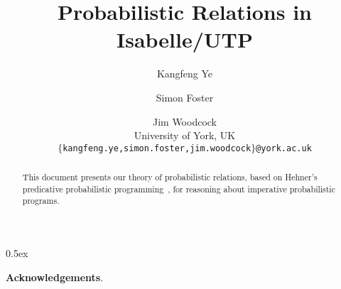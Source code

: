 \documentclass[11pt,a4paper]{article}
\begin{document}
\title{Probabilistic Relations in Isabelle/UTP}

\author{Kangfeng Ye \and Simon Foster \and Jim Woodcock \\[.5ex] University of York, UK \\[2ex] \texttt{\small $\{$kangfeng.ye,simon.foster,jim.woodcock$\}$@york.ac.uk}}

\maketitle

\begin{abstract}
  This document presents our theory of probabilistic relations, based on Hehner's predicative probabilistic programming~\cite{Hehner2011}, for reasoning about imperative probabilistic programs. 
\end{abstract}

\tableofcontents

\parindent 0pt\parskip 0.5ex








\vspace{4ex}
\noindent\textbf{Acknowledgements}. 

\appendix

\vspace{4ex}

\pagebreak 


\end{document}
